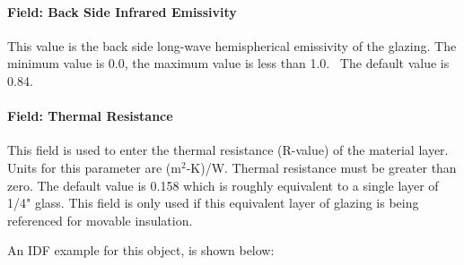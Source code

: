 \paragraph{Field: Back Side Infrared Emissivity}\label{field-back-side-infrared-emissivity}

This value is the back side long-wave hemispherical emissivity of the glazing. The minimum value is 0.0, the maximum value is less than 1.0.~ The default value is 0.84.

\paragraph{Field: Thermal Resistance}\label{field-thermal-resistance-equivglazing}

This field is used to enter the thermal resistance (R-value) of the material layer. Units for this parameter are (m\(^{2}\)-K)/W. Thermal resistance must be greater than zero. The default value is 0.158 which is roughly equivalent to a single layer of 1/4" glass. This field is only used if this equivalent layer of glazing is being referenced for movable insulation.

An IDF example for this object, is shown below:

